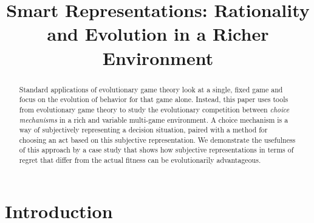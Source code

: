 \documentclass[fleqn,reqno,12pt]{article}
\title{Smart Representations: {R}ationality and Evolution in a Richer  Environment}
\date{}
\theoremstyle{Satz}
\theoremstyle{Bsp}
\begin{document}
\maketitle

\begin{abstract}
  \normalsize Standard applications of evolutionary game theory look at a single, fixed game
  and focus on the evolution of behavior for that game alone. Instead, this paper uses tools
  from evolutionary game theory to study the evolutionary competition between \emph{choice
    mechanisms} in a rich and variable multi-game environment. A choice mechanism is a way of subjectively
  representing a decision situation, paired with a method for choosing an act based on this
  subjective representation. We demonstrate the usefulness of this approach by a case study
  that shows how subjective representations in terms of regret that differ from the
  actual fitness can be evolutionarily advantageous.
\end{abstract}

\newpage

\section{Introduction}
\label{sec:intr--motiv}


\end{document}
